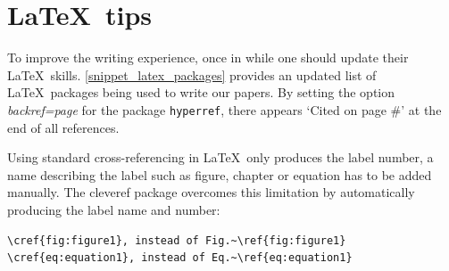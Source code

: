 \documentclass[authoryear,3p,times,preprint,review,fleqn]{elsarticle}
\renewcommand*{\backref}[1]{}
\renewcommand*{\backrefalt}[4]{[{%
    \ifcase #1 %
          \or Cited on page~#2%
          \else Cited on pages #2%
    \fi%
    }]}
\numberwithin{equation}{section}
\theoremstyle{remark}
\begin{document}
\section{\LaTeX\ tips}\label{sec:latex}

To improve the writing experience, once in while one should update their \LaTeX\ skills. \cref{snippet_latex_packages} provides an updated list of \LaTeX\ packages being used to write our papers.
By setting the option \textit{backref=page} for the package \texttt{hyperref}, there appears `Cited on page \#' at the end of all references. 

Using standard cross-referencing in \LaTeX\ only produces the label number, a name describing the label such as figure, chapter or equation has to be added manually. The cleveref package overcomes this limitation by automatically producing the label name and number:

\begin{verbatim}
\cref{fig:figure1}, instead of Fig.~\ref{fig:figure1}
\cref{eq:equation1}, instead of Eq.~\ref{eq:equation1}
\end{verbatim}

\begin{figure}[!h]
  \begin{snippetlatex}[caption={Commonly used \LaTeX\ packages.},label={snippet_latex_packages},framerule=1pt,tabsize=3]
    \usepackage{amsmath,amssymb, mathtools,mathrsfs,stmaryrd,titletoc}
    \usepackage{natbib}
    \usepackage[scaled=0.92]{helvet}  %
    \renewcommand{\rmdefault}{ptm}    %
    \usepackage[retainorgcmds]{IEEEtrantools}
    \usepackage[usenames]{color}
    \usepackage{tabularx}
    \usepackage{booktabs}    
    \usepackage[font=small,labelfont=md]{caption,subfig}
    \usepackage{multirow}
    \usepackage[T1]{fontenc} %
    \usepackage[bookmarks=true,colorlinks=true,linkcolor=blue,backref=page]{hyperref}
    \usepackage{float}         %
    \usepackage{listings}      %
    \usepackage{algorithm}
    \usepackage{algorithmicx}
    \usepackage{algpseudocode}
    \usepackage[activate={true,nocompatibility},final,tracking=true,
    kerning=true,spacing=true,factor=1100,stretch=10,shrink=10]{microtype}
    \usepackage[capitalise]{cleveref} %


    \renewcommand*{\backref}[1]{}
    \renewcommand*{\backrefalt}[4]{[{%
        \ifcase #1 %
              \or Cited on page~#2%
              \else Cited on pages #2%
        \fi%
        }]}
  \end{snippetlatex}
\end{figure}
\end{document}
